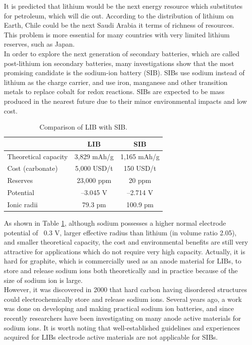 It is predicted that lithium would be the next energy resource which substitutes for petroleum, which will die out.\cite{Jaskula2016} According to the distribution of lithium on Earth\cite{Jaskula2011a}, Chile could be the next Saudi Arabia it terms of richness of resources. This problem is more essential for many countries with very limited lithium reserves, such as Japan. \\
In order to explore the next generation of secondary batteries, which are called post-lithium ion secondary batteries, many investigations
show that the most promising candidate is the sodium-ion battery (SIB). SIBs use sodium instead of lithium as the charge carrier, and use iron, manganese and other transition metals to replace cobalt for redox reactions. SIBs are expected to be mass produced in the nearest future due to their minor environmental impacts and low cost.

\begin{table}[ht]
\centering %
\begin{tabular}{|l|c|c|} %
\hline %
 & LIB & SIB\\ [0.5ex] %
\hline %
Theoretical capacity & 3,829 mAh/g & 1,165 mAh/g \\[1.5ex] %
Cost (carbonate) & 5,000 USD/t & 150 USD/t \\[1.5ex]%
Reserves & 23,000 ppm & 20 ppm \\[1.5ex]
Potential & –3.045 V & –2.714 V \\[1.5ex]
Ionic radii & 79.3 pm & 100.9 pm \\[1.5ex]
\hline %
\end{tabular}
\caption{Comparison of LIB with SIB.} %
\label{table1.1} %
\end{table}

As shown in Table \ref{table1.1}, although sodium possesses a higher normal electrode potential of ~0.3 V, larger effective radius than lithium (in volume ratio 2.05), and smaller theoretical capacity, the cost and environmental benefits are still very attractive for applications which do not require very high capacity. Actually, it is hard for graphite, which is commercially used as an anode material for LIBs, to store and release sodium ions both theoretically and in practice because of the size of sodium ion is large. \\
However, it was discovered in 2000 that hard carbon having disordered structures could electrochemically store and release sodium ions.\cite{Stevens2000} Several years ago, a work was done on developing and making practical sodium ion batteries, and since recently researchers have been investigating on many anode active materials for sodium ions. It is worth noting that well-established guidelines and experiences acquired for LIBs electrode active materials are not applicable for SIBs.\cite{Lang2010,Armand2008,KUZE2013}


